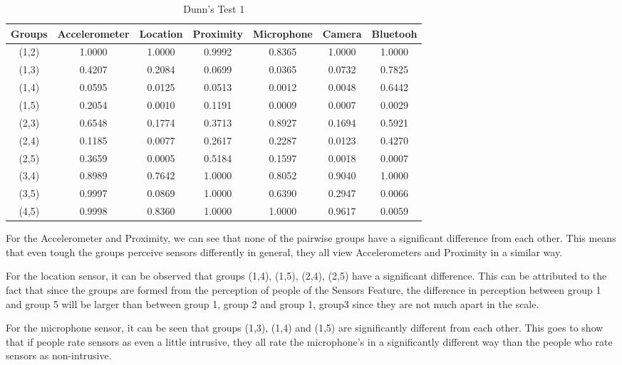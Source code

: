 \begin{table}[h!]
  \centering
  \caption{Dunn's Test 1}
  \label{tab:dunn_sensors}
  \begin{tabular}{ccccccc}
    \toprule
     Groups & Accelerometer & Location & Proximity & Microphone & Camera & Bluetooh \\
    \midrule
    (1,2) & 1.0000 & 1.0000 & 0.9992 & 0.8365 & 1.0000 & 1.0000 \\
    (1,3) & 0.4207 & 0.2084 & 0.0699 & 0.0365 & 0.0732 & 0.7825 \\
    (1,4) & 0.0595 & 0.0125 & 0.0513 & 0.0012 & 0.0048 & 0.6442 \\
    (1,5) & 0.2054 & 0.0010 & 0.1191 & 0.0009 & 0.0007 & 0.0029 \\
    (2,3) & 0.6548 & 0.1774 & 0.3713 & 0.8927 & 0.1694 & 0.5921 \\
    (2,4) & 0.1185 & 0.0077 & 0.2617 & 0.2287 & 0.0123 & 0.4270 \\
    (2,5) & 0.3659 & 0.0005 & 0.5184 & 0.1597 & 0.0018 & 0.0007 \\
    (3,4) & 0.8989 & 0.7642 & 1.0000 & 0.8052 & 0.9040 & 1.0000 \\
    (3,5) & 0.9997 & 0.0869 & 1.0000 & 0.6390 & 0.2947 & 0.0066 \\
    (4,5) & 0.9998 & 0.8360 & 1.0000 & 1.0000 & 0.9617 & 0.0059 \\
    \bottomrule
  \end{tabular}
\end{table} 

For the Accelerometer and Proximity, we can see that none of the pairwise groups have a significant difference from each other. This means that even tough the groups perceive sensors differently in general, they all view Accelerometers and Proximity in a similar way. 

For the location sensor, it can be observed that groups (1,4), (1,5), (2,4), (2,5) have a significant difference. This can be attributed to the fact that since the groups are formed from the perception of people of the Sensors Feature, the difference in perception between group 1 and group 5 will be larger than between group 1, group 2 and group 1, group3 since they are not much apart in the scale.

For the microphone sensor, it can be seen that groups (1,3), (1,4) and (1,5) are significantly different from each other. This goes to show that
if people rate sensors as even a little intrusive, they all rate the microphone's in a significantly different way than the people who rate sensors as non-intrusive.

